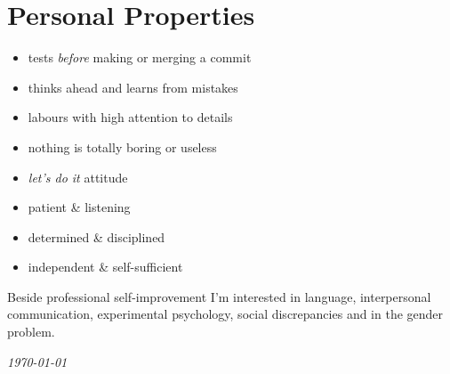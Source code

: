 \documentclass[a4paper,12pt]{article}
\newcommand\Yell{\textbf}
\newcommand\Label{\textsf}
\newcommand{\compress}{\setlength\itemsep{-\parskip}}
\newcommand{\midline}{\rule[0.5ex]{\linewidth-\parindent}{.5pt}}
\newenvironment{compressedItemize}{\begin{itemize}\compress}{\end{itemize}}
\begin{document}
%

\section{Personal Properties}

%
%
\begin{multicols}{2}
\begin{compressedItemize}
\item	tests \textit{before} making or merging a commit
\item	thinks ahead and learns from mistakes
\item	labours with high attention to details
\item	nothing is totally boring or useless
\columnbreak
\item	\textit{let's do it} attitude
\item	patient \& listening
\item	determined \& disciplined
\item	independent \& self-sufficient
\end{compressedItemize}
\end{multicols}

\medskip

Beside professional self-improvement I'm interested in language, interpersonal
communication, experimental psychology, social discrepancies and in the gender
problem.

\center\itshape\today
\end{document}

